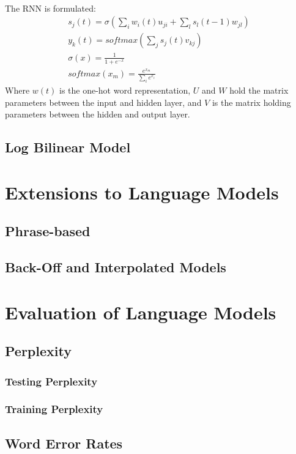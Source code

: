 \documentclass[12pt]{ociamthesis}
\begin{document}
\paragraph{}

The RNN is formulated:
\begin{align}
s_j(t) = \sigma \left( \sum_i w_i(t) u_{ji} + \sum_l s_l (t-1) w_{jl} \right)
\\y_k(t) = softmax \left( \sum_j s_j(t) v_{kj} \right)
\\ \sigma(x) = \frac{1}{1+e^{-x}}
\\ softmax(x_m) = \frac{e^{x_m} }{ \sum_i e^{x_i} } 
\end{align}
Where $w(t)$ is the one-hot word representation, $U$ and $W$ hold the matrix parameters between the input and hidden layer, and $V$ is the matrix holding parameters between the hidden and output layer.


\subsection{Log Bilinear Model}
\cite{MnihHinton2007}


\section {Extensions to Language Models}
\subsection{Phrase-based}
\subsection{Back-Off and Interpolated Models}

\section {Evaluation of Language Models}
\subsection{Perplexity}
\subsubsection{Testing Perplexity}
\subsubsection{Training Perplexity}
\subsection{Word Error Rates}



 
\end{document}
